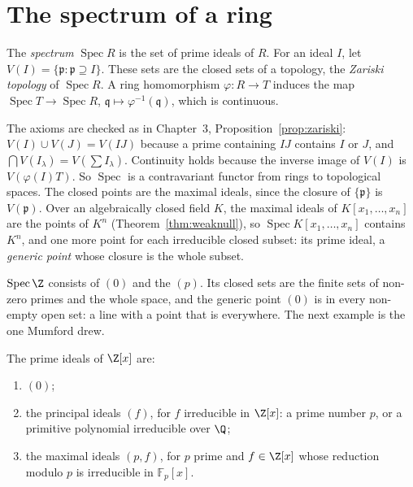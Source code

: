 \section{The spectrum of a ring}

\begin{definition}\label{def:spec}
The \emph{spectrum} $\operatorname{Spec}R$ is the set of prime ideals of $R$. For an ideal $I$, let $V(I)=\{\mathfrak p:\mathfrak p\supseteq I\}$. These sets are the closed sets of a topology, the \emph{Zariski topology} of $\operatorname{Spec}R$. A ring
homomorphism $\varphi\colon R\to T$ induces the map $\operatorname{Spec}T\to\operatorname{Spec}R$, $\mathfrak q\mapsto\varphi^{-1}(\mathfrak q)$, which is continuous.
\end{definition}

The axioms are checked as in Chapter~3, Proposition~\ref{prop:zariski}: $V(I)\cup V(J)=V(IJ)$ because a prime containing $IJ$ contains $I$ or $J$, and $\bigcap V(I_\lambda)=V(\sum I_\lambda)$. Continuity holds because the
inverse image of $V(I)$ is $V(\varphi(I)T)$. So $\operatorname{Spec}$ is a contravariant functor from rings to topological spaces. The closed points are the maximal ideals, since the closure of $\{\mathfrak p\}$ is $V(\mathfrak p)$.
Over an algebraically closed field $K$, the maximal ideals of $K[x_1,\dots,x_n]$ are the points of $K^n$ (Theorem~\ref{thm:weaknull}), so $\operatorname{Spec}K[x_1,\dots,x_n]$ contains $K^n$, and one more point for each
irreducible closed subset: its prime ideal, a \emph{generic point} whose closure is the whole subset.

$\operatorname{Spec}\Z$ consists of $(0)$ and the $(p)$. Its closed sets are the finite sets of non-zero primes and the whole space, and the generic point $(0)$ is in every non-empty open set: a line with a point that is everywhere.
The next example is the one Mumford drew.

\begin{theorem}\label{thm:speczx}
The prime ideals of $\Z[x]$ are:
\begin{enumerate}[label=(\alph*)]
\item $(0)$;
\item the principal ideals $(f)$, for $f$ irreducible in $\Z[x]$: a prime number $p$, or a primitive polynomial irreducible over $\Q$;
\item the maximal ideals $(p,f)$, for $p$ prime and $f\in\Z[x]$ whose reduction modulo $p$ is irreducible in $\mathbb F_p[x]$.
\end{enumerate}
\end{theorem}

